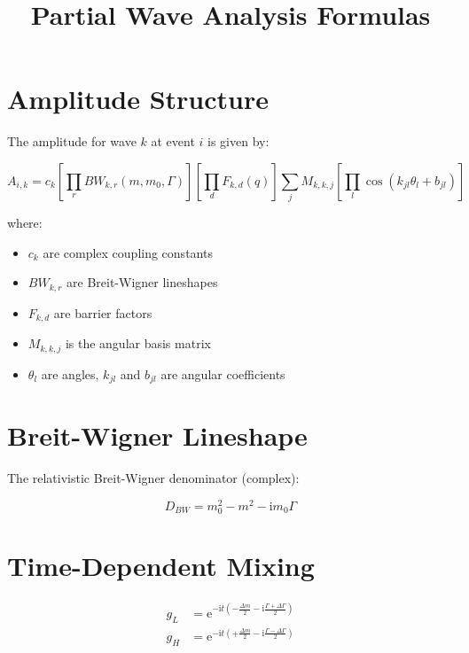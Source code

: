 \documentclass[12pt,a4paper]{article}
\title{Partial Wave Analysis Formulas}
\author{}
\date{}
\newcommand{\ee}{\mathrm{e}}
\newcommand{\ii}{\mathrm{i}}
\begin{document}
\maketitle

\section{Amplitude Structure}

The amplitude for wave $k$ at event $i$ is given by:

\begin{equation}
A_{i,k} = c_k \left[\prod_{r} BW_{k,r}(m, m_0, \Gamma)\right] \left[\prod_{d} F_{k,d}(q)\right] \sum_{j} M_{k,k,j} \left[\prod_{l} \cos(k_{jl} \theta_{l} + b_{jl})\right]
\end{equation}

where:
\begin{itemize}
    \item $c_k$ are complex coupling constants
    \item $BW_{k,r}$ are Breit-Wigner lineshapes
    \item $F_{k,d}$ are barrier factors
    \item $M_{k,k,j}$ is the angular basis matrix
    \item $\theta_l$ are angles, $k_{jl}$ and $b_{jl}$ are angular coefficients
\end{itemize}

\section{Breit-Wigner Lineshape}

The relativistic Breit-Wigner denominator (complex):

\begin{equation}
D_{BW} = m_0^2 - m^2 - \ii m_0 \Gamma
\end{equation}

\section{Time-Dependent Mixing}

\begin{align}
g_L &= \ee^{-\ii t \left(-\frac{\Delta m}{2} - \ii \frac{\Gamma + \Delta\Gamma}{2}\right)} \\
g_H &= \ee^{-\ii t \left(+\frac{\Delta m}{2} - \ii \frac{\Gamma - \Delta\Gamma}{2}\right)}
\end{align}
\end{document}
